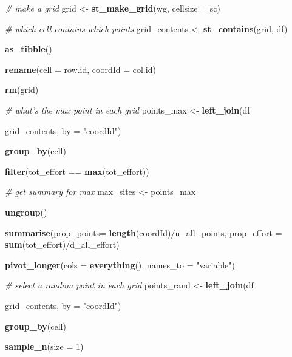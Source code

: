 \documentclass[]{article}
\newenvironment{Shaded}{}{}
\newcommand{\CommentTok}[1]{\textcolor[rgb]{0.38,0.63,0.69}{\textit{#1}}}
\newcommand{\DataTypeTok}[1]{\textcolor[rgb]{0.56,0.13,0.00}{#1}}
\newcommand{\DecValTok}[1]{\textcolor[rgb]{0.25,0.63,0.44}{#1}}
\newcommand{\KeywordTok}[1]{\textcolor[rgb]{0.00,0.44,0.13}{\textbf{#1}}}
\newcommand{\NormalTok}[1]{#1}
\newcommand{\OperatorTok}[1]{\textcolor[rgb]{0.40,0.40,0.40}{#1}}
\newcommand{\StringTok}[1]{\textcolor[rgb]{0.25,0.44,0.63}{#1}}
\begin{document}
\begin{Shaded}
\begin{Highlighting}[]
{{{{{{{{{{  \CommentTok{# make a grid}
\NormalTok{  grid <-}\StringTok{ }\KeywordTok{st_make_grid}\NormalTok{(wg, }\DataTypeTok{cellsize =}\NormalTok{ sc)}
  
  \CommentTok{# which cell contains which points}
\NormalTok{  grid_contents <-}\StringTok{ }\KeywordTok{st_contains}\NormalTok{(grid, df) }\OperatorTok{%
\StringTok{    }\KeywordTok{as_tibble}\NormalTok{() }\OperatorTok{%
\StringTok{    }\KeywordTok{rename}\NormalTok{(}\DataTypeTok{cell =}\NormalTok{ row.id, }\DataTypeTok{coordId =}\NormalTok{ col.id)}
  
  \KeywordTok{rm}\NormalTok{(grid)}
  
  \CommentTok{# what's the max point in each grid}
\NormalTok{  points_max <-}\StringTok{ }\KeywordTok{left_join}\NormalTok{(df }\OperatorTok{%
\NormalTok{                   grid_contents, }\DataTypeTok{by =} \StringTok{"coordId"}\NormalTok{) }\OperatorTok{%
\StringTok{    }\KeywordTok{group_by}\NormalTok{(cell) }\OperatorTok{%
\StringTok{    }\KeywordTok{filter}\NormalTok{(tot_effort }\OperatorTok{==}\StringTok{ }\KeywordTok{max}\NormalTok{(tot_effort))}
  
  \CommentTok{# get summary for max}
\NormalTok{  max_sites <-}\StringTok{ }\NormalTok{points_max }\OperatorTok{%
\StringTok{    }\KeywordTok{ungroup}\NormalTok{() }\OperatorTok{%
\StringTok{    }\KeywordTok{summarise}\NormalTok{(}\DataTypeTok{prop_points=} \KeywordTok{length}\NormalTok{(coordId)}\OperatorTok{/}\NormalTok{n_all_points,}
              \DataTypeTok{prop_effort =} \KeywordTok{sum}\NormalTok{(tot_effort)}\OperatorTok{/}\NormalTok{d_all_effort) }\OperatorTok{%
\StringTok{    }\KeywordTok{pivot_longer}\NormalTok{(}\DataTypeTok{cols =} \KeywordTok{everything}\NormalTok{(),}
                 \DataTypeTok{names_to =} \StringTok{"variable"}\NormalTok{)}
  
  \CommentTok{# select a random point in each grid}
\NormalTok{  points_rand <-}\StringTok{ }\KeywordTok{left_join}\NormalTok{(df }\OperatorTok{%
\NormalTok{                   grid_contents, }\DataTypeTok{by =} \StringTok{"coordId"}\NormalTok{) }\OperatorTok{%
\StringTok{    }\KeywordTok{group_by}\NormalTok{(cell) }\OperatorTok{%
\StringTok{    }\KeywordTok{sample_n}\NormalTok{(}\DataTypeTok{size =} \DecValTok{1}\NormalTok{)}
  
}}}}}}}}}}}}}}}}}}}}}
\end{Highlighting}
\end{Shaded}
\end{document}
